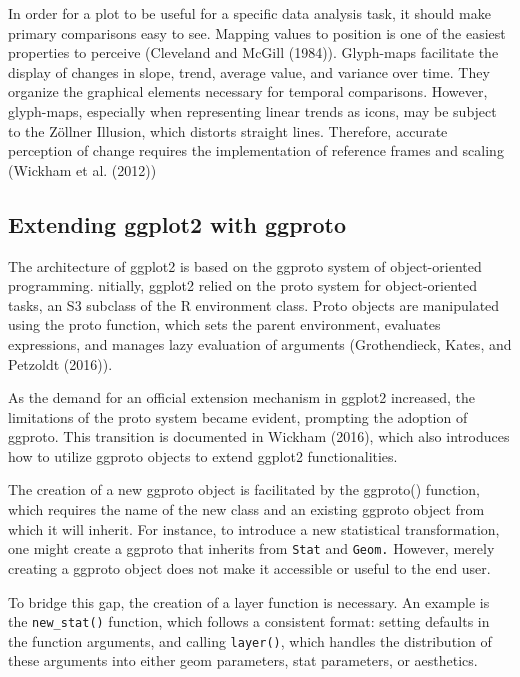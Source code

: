 In order for a plot to be useful for a specific data analysis task, it should make primary comparisons easy to see. Mapping values to position is one of the easiest properties to perceive (Cleveland and McGill (1984)). Glyph-maps facilitate the display of changes in slope, trend, average value, and variance over time. They organize the graphical elements necessary for temporal comparisons. However, glyph-maps, especially when representing linear trends as icons, may be subject to the Zöllner Illusion, which distorts straight lines. Therefore, accurate perception of change requires the implementation of reference frames and scaling (Wickham et al. (2012))

\subsection{Extending ggplot2 with ggproto}\label{extending-ggplot2-with-ggproto}

The architecture of ggplot2 is based on the ggproto system of object-oriented programming. nitially, ggplot2 relied on the proto system for object-oriented tasks, an S3 subclass of the R environment class. Proto objects are manipulated using the proto function, which sets the parent environment, evaluates expressions, and manages lazy evaluation of arguments (Grothendieck, Kates, and Petzoldt (2016)).

As the demand for an official extension mechanism in ggplot2 increased, the limitations of the proto system became evident, prompting the adoption of ggproto. This transition is documented in Wickham (2016), which also introduces how to utilize ggproto objects to extend ggplot2 functionalities.

The creation of a new ggproto object is facilitated by the ggproto() function, which requires the name of the new class and an existing ggproto object from which it will inherit. For instance, to introduce a new statistical transformation, one might create a ggproto that inherits from \texttt{Stat} and \texttt{Geom.} However, merely creating a ggproto object does not make it accessible or useful to the end user.

To bridge this gap, the creation of a layer function is necessary. An example is the \texttt{new\_stat()} function, which follows a consistent format: setting defaults in the function arguments, and calling \texttt{layer()}, which handles the distribution of these arguments into either geom parameters, stat parameters, or aesthetics.

